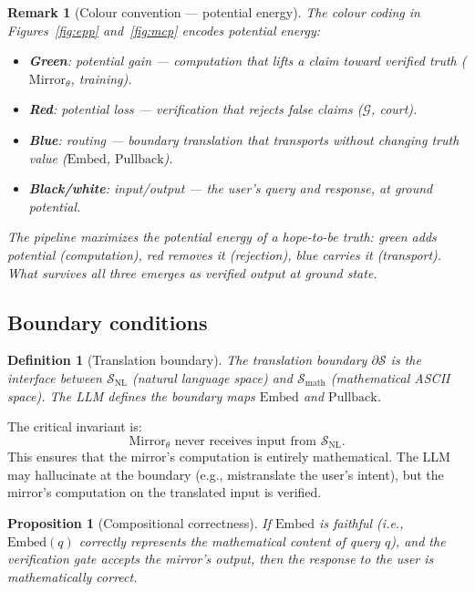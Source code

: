 \documentclass[11pt,a4paper]{article}
\newtheorem{proposition}[theorem]{Proposition}
\newtheorem{definition}[theorem]{Definition}
\newtheorem{remark}[theorem]{Remark}
\newcommand{\cG}{\mathcal{G}}
\newcommand{\cS}{\mathcal{S}}
\newcommand{\Embed}{\mathrm{Embed}}
\newcommand{\Pullback}{\mathrm{Pullback}}
\newcommand{\Mirror}{\mathrm{Mirror}}
\begin{document}
\begin{remark}[Colour convention --- potential energy]\label{rem:color}
The colour coding in Figures~\ref{fig:epp} and~\ref{fig:mcp}
encodes potential energy:
\begin{itemize}[nosep]
\item \textbf{Green}: potential gain --- computation that lifts a
  claim toward verified truth ($\Mirror_\theta$, training).
\item \textbf{Red}: potential loss --- verification that rejects
  false claims ($\cG$, court).
\item \textbf{Blue}: routing --- boundary translation that transports
  without changing truth value ($\Embed$, $\Pullback$).
\item \textbf{Black/white}: input/output --- the user's query and
  response, at ground potential.
\end{itemize}
The pipeline maximizes the potential energy of a hope-to-be truth:
green adds potential (computation), red removes it (rejection),
blue carries it (transport).
What survives all three emerges as verified output at ground state.
\end{remark}

\subsection{Boundary conditions}

\begin{definition}[Translation boundary]\label{def:boundary}
The translation boundary $\partial\cS$ is the interface between
$\cS_{\text{NL}}$ (natural language space) and
$\cS_{\text{math}}$ (mathematical ASCII space).
The LLM defines the boundary maps $\Embed$ and $\Pullback$.
\end{definition}

The critical invariant is:
\begin{equation}\label{eq:invariant}
\Mirror_\theta \text{ never receives input from } \cS_{\text{NL}}.
\end{equation}
This ensures that the mirror's computation is entirely mathematical.
The LLM may hallucinate at the boundary (e.g., mistranslate
the user's intent), but the mirror's computation on the
translated input is verified.

\begin{proposition}[Compositional correctness]\label{prop:compose}
If $\Embed$ is faithful
(i.e., $\Embed(q)$ correctly represents the mathematical
content of query $q$), and the verification gate accepts the
mirror's output, then the response to the user is mathematically
correct.
\end{proposition}
\end{document}
